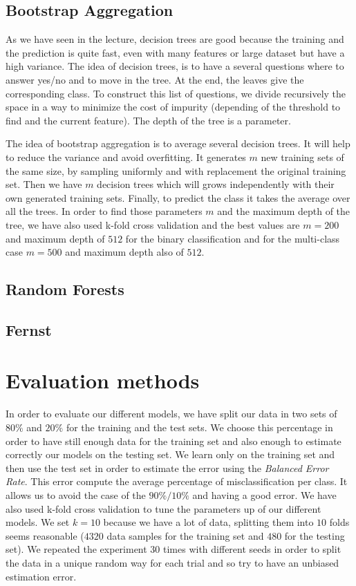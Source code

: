 \documentclass{article} %
\begin{document}
\subsection{Bootstrap Aggregation}

As we have seen in the lecture, decision trees are good because the training and the prediction is quite fast, even with many features or large dataset but have a high variance. The idea of decision trees, is to have a several questions where to answer yes/no and to move in the tree. At the end, the leaves give the corresponding class. To construct this list of questions, we divide recursively the space in a way to minimize the cost of impurity (depending of the threshold to find and the current feature). The depth of the tree is a parameter.

The idea of bootstrap aggregation is to average several decision trees. It will help to reduce the variance and avoid overfitting. It generates $m$ new training sets of the same size, by sampling uniformly and with replacement the original training set. Then we have $m$ decision trees which will grows independently with their own generated training sets. Finally, to predict the class it takes the average over all the trees. In order to find those parameters $m$ and the maximum depth of the tree, we have also used k-fold cross validation and the best values are $m = 200$ and maximum depth of $512$ for the binary classification and for the multi-class case $m = 500$ and maximum depth also of $512$.

\subsection{Random Forests}

\subsection{Fernst}

\section{Evaluation methods}

In order to evaluate our different models, we have split our data in two sets of $80\%$ and $20\%$ for the training and the test sets. We choose this percentage in order to have still enough data for the training set and also enough to estimate correctly our models on the testing set. We learn only on the training set and then use the test set in order to estimate the error using the \textit{Balanced Error Rate}. This error compute the average percentage of misclassification per class. It allows us to avoid the case of the $90\%/10\%$ and having a good error. We have also used k-fold cross validation to tune the parameters up of our different models. We set $k=10$ because we have a lot of data, splitting them into $10$ folds seems reasonable ($4320$ data samples for the training set and $480$ for the testing set). We repeated the experiment $30$ times with different seeds in order to split the data in a unique random way for each trial and so try to have an unbiased estimation error. 
\end{document}
